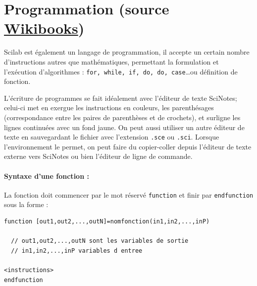 \section[Programmation]
        {Programmation (source 
        \href{https://fr.wikibooks.org/wiki/Découvrir_Scilab}{Wikibooks}) }

Scilab est également un langage de programmation, il accepte un certain nombre 
d'instructions autres que mathématiques, permettant la formulation et 
l'exécution d'algorithmes : \verb?for, while, if, do, do, case?\ldots ou 
définition de fonction.

L'écriture de programmes se fait idéalement avec l'éditeur de 
texte SciNotes; celui-ci met en exergue les instructions en couleurs, 
les parenthésages (correspondance entre les paires de parenthèses 
et de crochets), et surligne les lignes continuées avec un fond jaune. 
On peut aussi utiliser un autre éditeur de texte en sauvegardant le fichier 
avec l'extension \verb?.sce? ou \verb?.sci?. Lorsque l'environnement le permet,
on peut faire du copier-coller depuis l'éditeur de texte externe vers SciNotes 
ou bien l'éditeur de ligne de commande.

\paragraph{Syntaxe d'une fonction :}

La fonction doit commencer par le mot réservé \verb?function? et finir par 
\verb?endfunction? sous la forme :
\begin{code}
\begin{verbatim}
function [out1,out2,...,outN]=nomfonction(in1,in2,...,inP)

  // out1,out2,...,outN sont les variables de sortie
  // in1,in2,...,inP variables d entree
          
<instructions>
endfunction
\end{verbatim}
\end{code}

